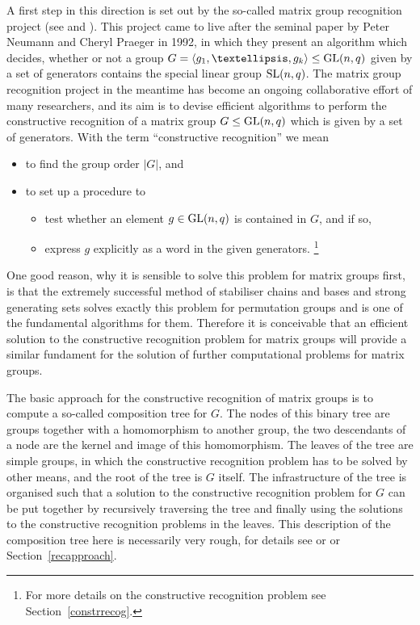 A first step in this direction is set out by the so-called matrix group
recognition project (see \cite{MatGrpProj} and \cite{OB}). This project
came to live after the seminal paper \cite{neumann-praeger} by Peter Neumann 
and Cheryl Praeger in 1992, in which they present an algorithm which decides,
whether or not a group $G = \left< g_1, \ldots, g_k\right> \le \GL(n,q)$
given by a set of generators contains the special linear group $\SL(n,q)$.
The matrix group recognition project in the meantime has become an ongoing 
collaborative effort of many researchers, and its aim
is to devise efficient algorithms to perform the constructive recognition
of a matrix group $G \le \GL(n,q)$ which is given by a set of generators. 
With the term ``constructive recognition'' we mean
\begin{itemize}
\setlength{\itemsep}{0pt}\setlength{\parskip}{0pt}
\item to find the group order $|G|$, and
\item to set up a procedure to 
\begin{itemize}
\setlength{\itemsep}{0pt}\setlength{\parskip}{0pt}
\item test whether an element $g \in \GL(n,q)$ is contained in $G$, and if so,
\item express $g$ explicitly as a word in the given generators.%
\footnote{For more details on the constructive recognition problem see
Section~\ref{constrrecog}.}
\end{itemize}
\end{itemize}
One good reason, why it is sensible to solve this problem for matrix groups
first, is that the extremely successful method of stabiliser chains and
bases and strong generating sets solves exactly
this problem for permutation groups and is one of the fundamental
algorithms for them. Therefore it is conceivable that an efficient solution
to the constructive recognition problem for matrix groups will provide a
similar fundament for the solution of further computational problems for
matrix groups.

The basic approach for the constructive recognition of matrix groups is
to compute a so-called composition tree for $G$. The nodes of this binary 
tree are groups together with a homomorphism to another group, the two
descendants of a node are the kernel and image of this homomorphism. The
leaves of the tree are simple groups, in which the constructive recognition
problem has to be solved by other means, and the root of the tree is $G$
itself. The infrastructure of the tree is organised such that a solution to
the constructive recognition problem for $G$ can be put together
by recursively traversing the tree and finally using the solutions to the
constructive recognition problems in the leaves. This description of the
composition tree here is
necessarily very rough, for details see \cite{MatGrpProj} or \cite{OB}
or Section~\ref{recapproach}.

